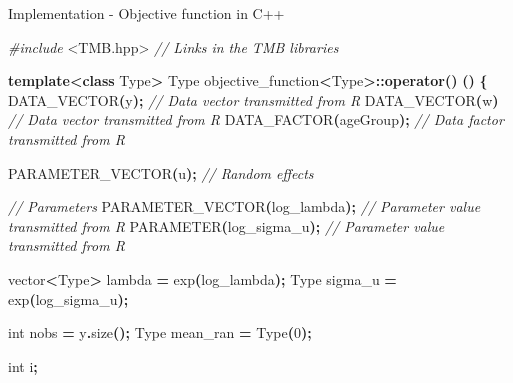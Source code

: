 \documentclass[aspectratio=169]{beamer}
\newenvironment{Shaded}{\begin{snugshade}}{\end{snugshade}}
\newcommand{\CommentTok}[1]{\textcolor[rgb]{0.56,0.35,0.01}{\textit{#1}}}
\newcommand{\DataTypeTok}[1]{\textcolor[rgb]{0.13,0.29,0.53}{#1}}
\newcommand{\DecValTok}[1]{\textcolor[rgb]{0.00,0.00,0.81}{#1}}
\newcommand{\ImportTok}[1]{#1}
\newcommand{\KeywordTok}[1]{\textcolor[rgb]{0.13,0.29,0.53}{\textbf{#1}}}
\newcommand{\NormalTok}[1]{#1}
\newcommand{\OperatorTok}[1]{\textcolor[rgb]{0.81,0.36,0.00}{\textbf{#1}}}
\newcommand{\PreprocessorTok}[1]{\textcolor[rgb]{0.56,0.35,0.01}{\textit{#1}}}
\begin{document}
\begin{frame}[fragile]{Implementation - Objective function in C++}
\protect\hypertarget{implementation---objective-function-in-c}{}
\tiny

\begin{Shaded}
\begin{Highlighting}[]
\PreprocessorTok{\#include }\ImportTok{\textless{}TMB.hpp\textgreater{}}\PreprocessorTok{              }\CommentTok{// Links in the TMB libraries}

\KeywordTok{template}\OperatorTok{\textless{}}\KeywordTok{class}\NormalTok{ Type}\OperatorTok{\textgreater{}}
\NormalTok{Type objective\_function}\OperatorTok{\textless{}}\NormalTok{Type}\OperatorTok{\textgreater{}::}\KeywordTok{operator}\OperatorTok{()} \OperatorTok{()}
\OperatorTok{\{}
\NormalTok{  DATA\_VECTOR}\OperatorTok{(}\NormalTok{y}\OperatorTok{);}                               \CommentTok{// Data vector transmitted from R}
\NormalTok{  DATA\_VECTOR}\OperatorTok{(}\NormalTok{w}\OperatorTok{)}                        \CommentTok{// Data vector transmitted from R}
\NormalTok{  DATA\_FACTOR}\OperatorTok{(}\NormalTok{ageGroup}\OperatorTok{);}                \CommentTok{// Data factor transmitted from R}

\NormalTok{  PARAMETER\_VECTOR}\OperatorTok{(}\NormalTok{u}\OperatorTok{);}                      \CommentTok{// Random effects}
   
  \CommentTok{// Parameters}
\NormalTok{  PARAMETER\_VECTOR}\OperatorTok{(}\NormalTok{log\_lambda}\OperatorTok{);}         \CommentTok{// Parameter value transmitted from R}
\NormalTok{  PARAMETER}\OperatorTok{(}\NormalTok{log\_sigma\_u}\OperatorTok{);}               \CommentTok{// Parameter value transmitted from R}
  
\NormalTok{  vector}\OperatorTok{\textless{}}\NormalTok{Type}\OperatorTok{\textgreater{}}\NormalTok{ lambda  }\OperatorTok{=}\NormalTok{ exp}\OperatorTok{(}\NormalTok{log\_lambda}\OperatorTok{);}
\NormalTok{  Type sigma\_u }\OperatorTok{=}\NormalTok{ exp}\OperatorTok{(}\NormalTok{log\_sigma\_u}\OperatorTok{);}

  \DataTypeTok{int}\NormalTok{ nobs }\OperatorTok{=}\NormalTok{ y}\OperatorTok{.}\NormalTok{size}\OperatorTok{();}
\NormalTok{  Type mean\_ran }\OperatorTok{=}\NormalTok{ Type}\OperatorTok{(}\DecValTok{0}\OperatorTok{);}
  
  \DataTypeTok{int}\NormalTok{ i}\OperatorTok{;}


\end{Highlighting}
\end{Shaded}
\end{frame}
\end{document}
